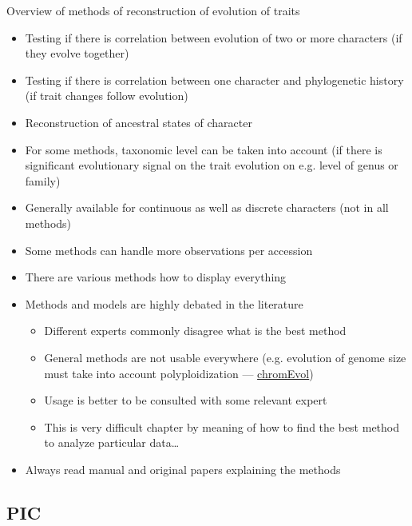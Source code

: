 \documentclass[compress, ucs, xelatex, 11pt, xcolor=svgnames,
  hyperref={
    bookmarks=true,
    unicode=true,
    colorlinks=true,
    pdftitle={Molecular data in R},
    plainpages=false,
    pdfauthor={Vojtech Zeisek},
    pdfsubject={Course about phylogeny and evolution in R},
    pdfcreator={XeLaTeX},
    pdfkeywords={R, evolution, phylogeny, molecular data},
    linkcolor=Tomato,
    anchorcolor=SaddleBrown,
    citecolor=Goldenrod,
    filecolor=DarkMagenta,
    menucolor=Sienna,
    urlcolor=DarkTurquoise,
    pdftex},
  url={hyphens, lowtilde} %
  ]{beamer}
\begin{document}
\begin{frame}[allowframebreaks]{Overview of methods of reconstruction of evolution of traits}
  \begin{itemize}
    \item Testing if there is correlation between evolution of two or more characters (if they evolve together)
    \item Testing if there is correlation between one character and phylogenetic history (if trait changes follow evolution)
    \item Reconstruction of ancestral states of character
    \item For some methods, taxonomic level can be taken into account (if there is significant evolutionary signal on the trait evolution on e.g. level of genus or family)
    \item Generally available for continuous as well as discrete characters (not in all methods)
    \item Some methods can handle more observations per accession
    \item There are various methods how to display everything
    \item Methods and models are highly debated in the literature
    \begin{itemize}
      \item Different experts commonly disagree what is the best method
      \item General methods are not usable everywhere (e.g. evolution of genome size must take into account polyploidization --- \href{https://www.tau.ac.il/~itaymay/cp/chromEvol/}{chromEvol})
      \item Usage is better to be consulted with some relevant expert
      \item This is very difficult chapter by meaning of how to find the best method to analyze particular data\ldots
    \end{itemize}
    \item Always read manual and original papers explaining the methods
  \end{itemize}
\end{frame}

\subsection{PIC}
\end{document}
